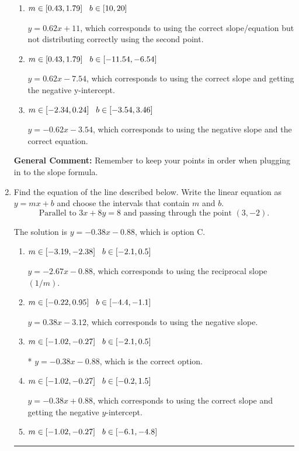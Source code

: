 \documentclass{extbook}[14pt]
\newcommand{\litem}[1]{\item #1

\rule{\textwidth}{0.4pt}}
\begin{document}
\begin{enumerate}
{\begin{enumerate}[label=\Alph*.]
* $y = 0.62x + 7.54$, which is the correct option.
\item \( m \in [0.43, 1.79] \hspace*{3mm} b \in [10, 20] \)

 $y = 0.62x + 11$, which corresponds to using the correct slope/equation but not distributing correctly using the second point.
\item \( m \in [0.43, 1.79] \hspace*{3mm} b \in [-11.54, -6.54] \)

 $y = 0.62x -7.54$, which corresponds to using the correct slope and getting the negative y-intercept.
\item \( m \in [-2.34, 0.24] \hspace*{3mm} b \in [-3.54, 3.46] \)

 $y = -0.62x -3.54$, which corresponds to using the negative slope and the correct equation.
\end{enumerate}

\textbf{General Comment:} Remember to keep your points in order when plugging in to the slope formula.
}
\litem{
Find the equation of the line described below. Write the linear equation as $ y=mx+b $ and choose the intervals that contain $m$ and $b$.
\[ \text{Parallel to } 3 x + 8 y = 8 \text{ and passing through the point } (3, -2). \]

The solution is \( y = -0.38x - 0.88 \), which is option C.\begin{enumerate}[label=\Alph*.]
\item \( m \in [-3.19, -2.38] \hspace*{3mm} b \in [-2.1, 0.5] \)

 $y = -2.67x - 0.88$, which corresponds to using the reciprocal slope $(1/m)$.
\item \( m \in [-0.22, 0.95] \hspace*{3mm} b \in [-4.4, -1.1] \)

 $y = 0.38x - 3.12$, which corresponds to using the negative slope.
\item \( m \in [-1.02, -0.27] \hspace*{3mm} b \in [-2.1, 0.5] \)

* $y = -0.38x - 0.88$, which is the correct option.
\item \( m \in [-1.02, -0.27] \hspace*{3mm} b \in [-0.2, 1.5] \)

 $y = -0.38x + 0.88$, which corresponds to using the correct slope and getting the negative $y$-intercept.
\item \( m \in [-1.02, -0.27] \hspace*{3mm} b \in [-6.1, -4.8] \)


\end{enumerate}}
\end{enumerate}
\end{document}
